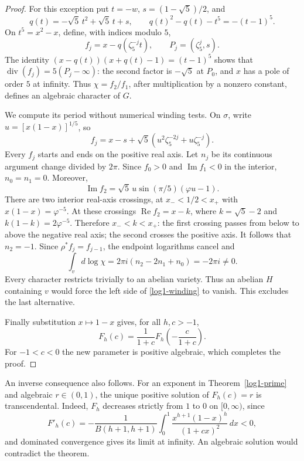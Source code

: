 \documentclass[11pt,a4paper]{article}
\theoremstyle{definition}
\theoremstyle{remark}
\numberwithin{equation}{section}
\begin{document}
\begin{proof}
For this exception put $t=-w$, $s=(1-\sqrt5)/2$, and
\[
 q(t)=-\sqrt5\,t^2+\sqrt5\,t+s,
 \qquad q(t)^2-q(t)-t^5=-(t-1)^5.
\]
On $t^5=x^2-x$, define, with indices modulo $5$,
\[
 f_j=x-q(\zeta_5^{-j}t),\qquad P_j=(\zeta_5^j,s).
\]
The identity
$(x-q(t))(x+q(t)-1)=(t-1)^5$ shows that
$\operatorname{div}(f_j)=5(P_j-\infty)$: the second factor is
$-\sqrt5$ at $P_0$, and $x$ has a pole of order $5$ at infinity.
Thus $\chi=f_2/f_1$, after multiplication by a nonzero constant,
defines an algebraic character of $G$.

We compute its period without numerical winding tests. On $\sigma$,
write $u=[x(1-x)]^{1/5}$, so
\[
 f_j=x-s+\sqrt5(u^2\zeta_5^{-2j}+u\zeta_5^{-j}).
\]
Every $f_j$ starts and ends on the positive real axis. Let $n_j$ be
its continuous argument change divided by $2\pi$. Since $f_0>0$ and
$\operatorname{Im} f_1<0$ in the interior, $n_0=n_1=0$. Moreover,
\[
 \operatorname{Im}f_2
 =\sqrt5\,u\sin(\pi/5)(\varphi u-1).
\]
There are two interior real-axis crossings, at
$x_-<1/2<x_+$ with $x(1-x)=\varphi^{-5}$. At these crossings
$\operatorname{Re}f_2=x-k$, where $k=\sqrt5-2$ and
$k(1-k)=2\varphi^{-5}$. Therefore $x_-<k<x_+$: the first crossing
passes from below to above the negative real axis; the second crosses
the positive axis. It follows that $n_2=-1$. Since
$\rho^*f_j=f_{j-1}$, the endpoint logarithms cancel and
\begin{equation}\label{log1-winding}
 \int_v d\log\chi=2\pi i(n_2-2n_1+n_0)=-2\pi i\ne0.
\end{equation}
Every character restricts trivially to an abelian variety. Thus an
abelian $H$ containing $v$ would force the left side of
\eqref{log1-winding} to vanish. This excludes the last alternative.

Finally substitution $x\mapsto1-x$ gives, for all $h,c>-1$,
\begin{equation}\label{log1-symmetry}
 F_h(c)=\frac1{1+c}F_h\!\left(-\frac c{1+c}\right).
\end{equation}
For $-1<c<0$ the new parameter is positive algebraic, which completes
the proof.
\end{proof}

An inverse consequence also follows. For an exponent in
Theorem~\ref{log1-prime} and algebraic $r\in(0,1)$, the unique positive
solution of $F_h(c)=r$ is transcendental. Indeed, $F_h$ decreases
strictly from $1$ to $0$ on $[0,\infty)$, since
\[
 F'_h(c)=-\frac1{B(h+1,h+1)}
 \int_0^1\frac{x^{h+1}(1-x)^h}{(1+cx)^2}\,dx<0,
\]
and dominated convergence gives its limit at infinity. An algebraic
solution would contradict the theorem.
\end{document}
